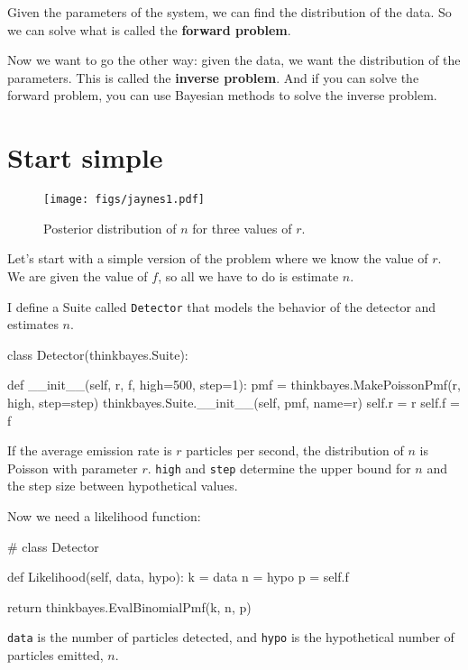 \documentclass[12pt]{book}
\theoremstyle{exercise}
\newcommand{\py}[1]{{\tt #1}}%
\begin{document}
Given the parameters of the system, we can find the distribution of
the data.  So we can solve what is called the {\bf forward problem}.

Now we want to go the other way: given the data, we
want the distribution of the parameters.  This is called
the {\bf inverse problem}.  And if you can solve the forward
problem, you can use Bayesian methods to solve the inverse problem.


\section{Start simple}

\begin{figure}
\centerline{\texttt{[image: figs/jaynes1.pdf]}}
\caption{Posterior distribution of $n$ for three values of $r$.}
\label{fig.jaynes1}
\end{figure}

Let's start with a simple version of the problem where we know
the value of $r$.  We are given the value of $f$, so all we
have to do is estimate $n$.

I define a Suite called \py{Detector} that models the behavior
of the detector and estimates $n$.

\begin{code}
class Detector(thinkbayes.Suite):

    def __init__(self, r, f, high=500, step=1):
        pmf = thinkbayes.MakePoissonPmf(r, high, step=step)
        thinkbayes.Suite.__init__(self, pmf, name=r)
        self.r = r
        self.f = f
\end{code}

If the average emission rate is $r$ particles per second, the
distribution of $n$ is Poisson with parameter $r$.
\py{high} and \py{step} determine the upper bound for $n$
and the step size between hypothetical values.

Now we need a likelihood function:

\begin{code}
# class Detector

    def Likelihood(self, data, hypo):
        k = data
        n = hypo
        p = self.f

        return thinkbayes.EvalBinomialPmf(k, n, p)
\end{code}

\py{data} is the number of particles detected, and \py{hypo} is
the hypothetical number of particles emitted, $n$.
\end{document}
